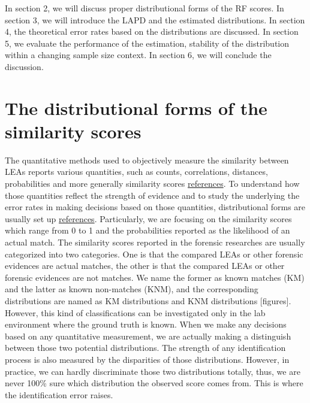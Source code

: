 \documentclass[]{elsarticle} %
\begin{document}
In section 2, we will discuss proper distributional forms of the RF
scores. In section 3, we will introduce the LAPD and the estimated
distributions. In section 4, the theoretical error rates based on the
distributions are discussed. In section 5, we evaluate the performance
of the estimation, stability of the distribution within a changing
sample size context. In section 6, we will conclude the discussion.

\hypertarget{the-distributional-forms-of-the-similarity-scores}{%
\section{The distributional forms of the similarity
scores}\label{the-distributional-forms-of-the-similarity-scores}}

The quantitative methods used to objectively measure the similarity
between LEAs reports various quantities, such as counts, correlations,
distances, probabilities and more generally similarity scores
\protect\hyperlink{references}{references}. To understand how those
quantities reflect the strength of evidence and to study the underlying
the error rates in making decisions based on those quantities,
distributional forms are usually set up
\protect\hyperlink{references}{references}. Particularly, we are
focusing on the similarity scores which range from 0 to 1 and the
probabilities reported as the likelihood of an actual match. The
similarity scores reported in the forensic researches are usually
categorized into two categories. One is that the compared LEAs or other
forensic evidences are actual matches, the other is that the compared
LEAs or other forensic evidences are not matches. We name the former as
known matches (KM) and the latter as known non-matches (KNM), and the
corresponding distributions are named as KM distributions and KNM
distributions {[}figures{]}. However, this kind of classifications can
be investigated only in the lab environment where the ground truth is
known. When we make any decisions based on any quantitative measurement,
we are actually making a distinguish between those two potential
distributions. The strength of any identification process is also
measured by the disparities of those distributions. However, in
practice, we can hardly discriminate those two distributions totally,
thus, we are never 100\% sure which distribution the observed score
comes from. This is where the identification error raises.
\end{document}

